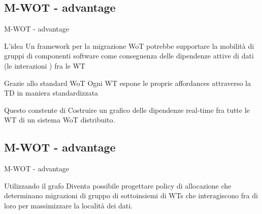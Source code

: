 \documentclass{beamer}
\begin{document}
\subsection{M-WOT - advantage}
\begin{frame}{M-WOT - advantage}
	\begin{block}{L'idea}
		Un framework per la migrazione WoT potrebbe supportare la mobilità di gruppi di componenti software  come conseguenza delle dipendenze attive di dati (le interazioni ) fra le WT \\
	\end{block}
	\begin{block}{Grazie allo standard WoT}
		Ogni WT espone le proprie affordances attraverso la TD in maniera standardizzata
	\end{block}
	\begin{block}{Questo constente di}
		Costruire un grafico delle dipendenze real-time fra tutte le WT di un sistema WoT distribuito.
	\end{block}
\end{frame}

\subsection{M-WOT - advantage}
\begin{frame}{M-WOT - advantage}
	\begin{block}{Utilizzando il grafo}
		Diventa possibile progettare policy di allocazione che determinano migrazioni
		di gruppo di sottoinsiemi di WTs che interagiscono fra di loro per massimizzare la località dei
		dati. \\
	\end{block}
\end{frame}
\end{document}
